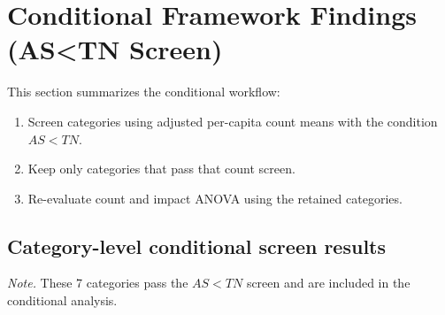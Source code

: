 
\section{Conditional Framework Findings (AS<TN Screen)}

This section summarizes the conditional workflow:
\begin{enumerate}
  \item Screen categories using adjusted per-capita count means with the condition $AS<TN$.
  \item Keep only categories that pass that count screen.
  \item Re-evaluate count and impact ANOVA using the retained categories.
\end{enumerate}

\subsection{Category-level conditional screen results}

\begin{table}[H]
  \centering
  \caption{Categories passing conditional screen ($AS<TN$).}
  \label{tab:conditional-screen-included}
  \small
\end{table}

\noindent\textit{Note.} These 7 categories pass the $AS<TN$ screen and are included in the conditional analysis.

